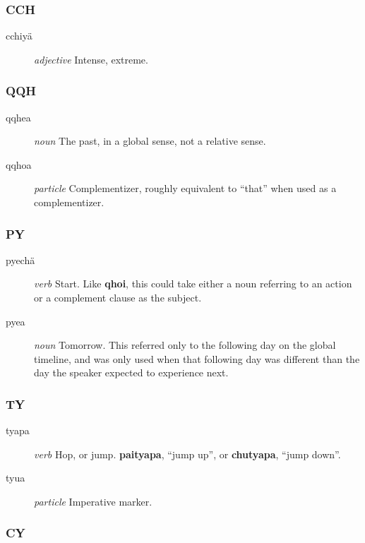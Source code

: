\documentclass{article}
\begin{document}
\subsubsection{CCH}

\begin{description}
\item [cchiy\"a] \emph{adjective} Intense, extreme.
\end{description}

\subsubsection{QQH}

\begin{description}
\item [qqhea] \emph{noun} The past, in a global sense, not a relative sense.
\item [qqhoa] \emph{particle} Complementizer, roughly equivalent to ``that'' when used as a complementizer.
\end{description}

\subsubsection{PY}

\begin{description}
\item [pyech\"a] \emph{verb} Start.  Like \textbf{qhoi}, this could take either a noun referring to an action or a complement clause as the subject.
\item [pyea] \emph{noun} Tomorrow.  This referred only to the following day on the global timeline, and was only used when that following day was different than the day the speaker expected to experience next.
\end{description}

\subsubsection{TY}

\begin{description}
\item [tyapa] \emph{verb} Hop, or jump.  \textbf{paityapa}, ``jump up'', or \textbf{chutyapa}, ``jump down''.
\item [tyua] \emph{particle} Imperative marker.
\end{description}

\subsubsection{CY}
\end{document}
